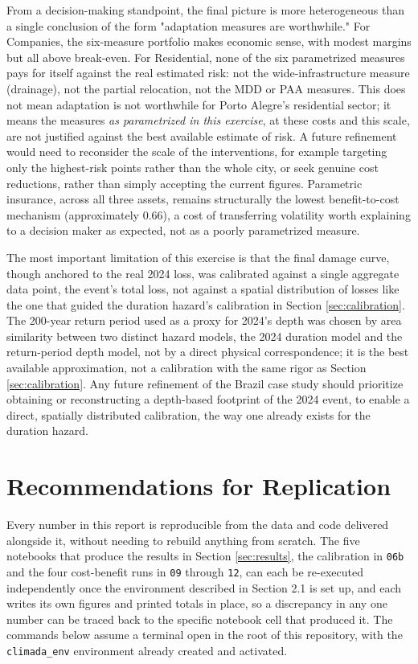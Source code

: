 \documentclass[11pt]{article}
\begin{document}
From a decision-making standpoint, the final picture is more heterogeneous than a single
conclusion of the form "adaptation measures are worthwhile." For Companies, the six-measure
portfolio makes economic sense, with modest margins but all above break-even. For
Residential, none of the six parametrized measures pays for
itself against the real estimated risk: not the wide-infrastructure measure (drainage), not
the partial relocation, not the MDD or PAA measures. This does not mean adaptation is not
worthwhile for Porto Alegre's residential sector; it means the measures \emph{as
parametrized in this exercise}, at these costs and this scale, are not justified against the
best available estimate of risk. A future refinement would need to reconsider the scale of
the interventions, for example targeting only the highest-risk points rather than the whole
city, or seek genuine cost reductions, rather than simply accepting the current figures.
Parametric insurance, across all three assets, remains structurally the lowest
benefit-to-cost mechanism (approximately 0.66), a cost of transferring volatility worth
explaining to a decision maker as expected, not as a poorly parametrized measure.

The most important limitation of this exercise is that the final damage curve, though
anchored to the real 2024 loss, was calibrated against a single aggregate data point, the
event's total loss, not against a spatial distribution of losses like the one that guided
the duration hazard's calibration in Section \ref{sec:calibration}. The 200-year return period used as a
proxy for 2024's depth was chosen by area similarity between two distinct hazard models,
the 2024 duration model and the return-period depth model, not by a direct physical
correspondence; it is the best available approximation, not a calibration with the same
rigor as Section \ref{sec:calibration}. Any future refinement of the Brazil case study should prioritize
obtaining or reconstructing a depth-based footprint of the 2024 event, to enable a direct,
spatially distributed calibration, the way one already exists for the duration hazard.

\section{Recommendations for Replication}

Every number in this report is reproducible from the data and code delivered alongside it,
without needing to rebuild anything from scratch. The five notebooks that produce the
results in Section \ref{sec:results}, the calibration in \texttt{06b} and the four
cost-benefit runs in \texttt{09} through \texttt{12}, can each be re-executed independently
once the environment described in Section 2.1 is set up, and each writes its own figures
and printed totals in place, so a discrepancy in any one number can be traced back to the
specific notebook cell that produced it. The commands below assume a terminal open in the
root of this repository, with the \texttt{climada\_env} environment already created and
activated.
\end{document}

